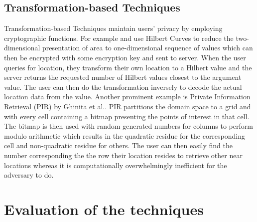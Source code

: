 \documentclass[english]{tktltiki2}
\theoremstyle{definition}
\theoremstyle{remark}
\begin{document}
\subsection{Transformation-based Techniques}

Transformation-based Techniques maintain users' privacy by employing cryptographic functions. For example \cite{Hilbert} and \cite{Um2010} use Hilbert Curves to reduce the two-dimensional presentation of area to one-dimensional sequence of values which can then be encrypted with some encryption key and sent to server.  When the user queries for location, they transform their own location to a Hilbert value and the server returns the requested number of Hilbert values closest to the argument value. The user can then do the transformation inversely to decode the actual location data from the value. Another prominent example is Private Information Retrieval (PIR) by Ghinita et al.\cite{Ghinita2008}. PIR partitions the domain space to a grid and with every cell containing a bitmap presenting the points of interest in that cell. The bitmap is then used with random generated numbers for columns to perform modulo arithmetic which results in the quadratic residue for the corresponding cell and non-quadratic residue for others. The user can then easily find the number corresponding the the row their location resides to retrieve other near locations whereas it is computationally overwhelmingly inefficient for the adversary to do.	

\section{Evaluation of the techniques}
\end{document}
